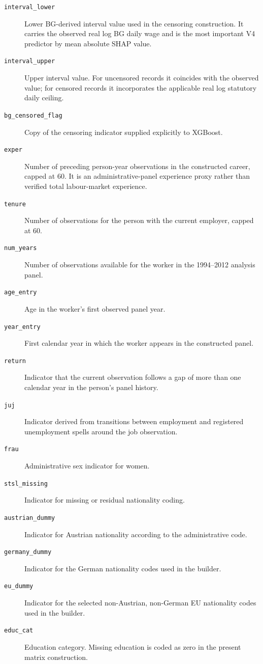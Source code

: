 \documentclass[12pt,a4paper,oneside,titlepage]{book}
\begin{document}
\begin{description}
  \item[\texttt{interval\_lower}] Lower BG-derived interval value used in the censoring construction. It carries the observed real log BG daily wage and is the most important V4 predictor by mean absolute SHAP value.
  \item[\texttt{interval\_upper}] Upper interval value. For uncensored records it coincides with the observed value; for censored records it incorporates the applicable real log statutory daily ceiling.
  \item[\texttt{bg\_censored\_flag}] Copy of the censoring indicator supplied explicitly to XGBoost.
  \item[\texttt{exper}] Number of preceding person-year observations in the constructed career, capped at 60. It is an administrative-panel experience proxy rather than verified total labour-market experience.
  \item[\texttt{tenure}] Number of observations for the person with the current employer, capped at 60.
  \item[\texttt{num\_years}] Number of observations available for the worker in the 1994--2012 analysis panel.
  \item[\texttt{age\_entry}] Age in the worker's first observed panel year.
  \item[\texttt{year\_entry}] First calendar year in which the worker appears in the constructed panel.
  \item[\texttt{return}] Indicator that the current observation follows a gap of more than one calendar year in the person's panel history.
  \item[\texttt{juj}] Indicator derived from transitions between employment and registered unemployment spells around the job observation.
  \item[\texttt{frau}] Administrative sex indicator for women.
  \item[\texttt{stsl\_missing}] Indicator for missing or residual nationality coding.
  \item[\texttt{austrian\_dummy}] Indicator for Austrian nationality according to the administrative code.
  \item[\texttt{germany\_dummy}] Indicator for the German nationality codes used in the builder.
  \item[\texttt{eu\_dummy}] Indicator for the selected non-Austrian, non-German EU nationality codes used in the builder.
  \item[\texttt{educ\_cat}] Education category. Missing education is coded as zero in the present matrix construction.

\end{description}
\end{document}
